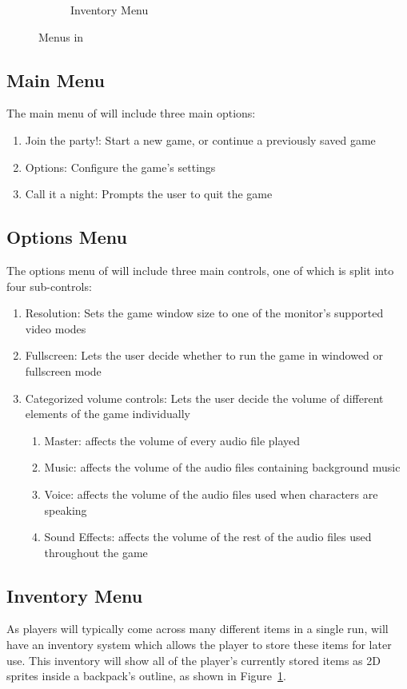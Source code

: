 \begin{figure}[htb]
\begin{subfigure}{.33\textwidth}
    \caption{Inventory Menu}
    \label{fig:menu_inventory}
  \end{subfigure}
  \caption{Menus in \ourgame{}}
  \label{fig:menus}
\end{figure}

\subsection{Main Menu}
The main menu of \ourgame{} will include three main options:
\begin{enumerate}
\item{Join the party!: Start a new game, or continue a previously saved game}
\item{Options: Configure the game's settings}
\item{Call it a night: Prompts the user to quit the game}
\end{enumerate}

\subsection{Options Menu}
The options menu of \ourgame{} will include three main controls, one of which is split into four sub-controls: 
\begin{enumerate}
\item{Resolution: Sets the game window size to one of the monitor's supported video modes}
\item{Fullscreen: Lets the user decide whether to run the game in windowed or fullscreen mode}
\item{Categorized volume controls: Lets the user decide the volume of different elements of the game individually
\begin{enumerate}
	\item{Master: affects the volume of every audio file played}
	\item{Music: affects the volume of the audio files containing background music}
	\item{Voice: affects the volume of the audio files used when characters are speaking}
	\item{Sound Effects: affects the volume of the rest of the audio files used throughout the game}
\end{enumerate}}
\end{enumerate}

\subsection{Inventory Menu}
\label{sec:inventory}
As players will typically come across many different items in a single run, \ourgame{} will have an inventory system which allows the player to store these items for later use. This inventory will show all of the player's currently stored items as 2D sprites inside a backpack's outline, as shown in Figure~\ref{fig:menu_inventory}.